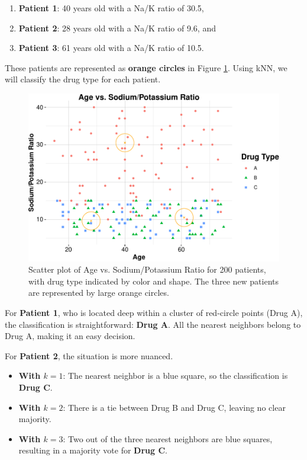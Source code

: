 \documentclass[
]{book}
\providecommand{\tightlist}{%
  \setlength{\itemsep}{0pt}\setlength{\parskip}{0pt}}
\theoremstyle{definition}
\theoremstyle{definition}
\theoremstyle{definition}
\theoremstyle{definition}
\theoremstyle{remark}
\begin{document}
\begin{enumerate}
\def\labelenumi{\arabic{enumi}.}
\tightlist
\item
  \textbf{Patient 1}: 40 years old with a Na/K ratio of 30.5,\\
\item
  \textbf{Patient 2}: 28 years old with a Na/K ratio of 9.6, and\\
\item
  \textbf{Patient 3}: 61 years old with a Na/K ratio of 10.5.
\end{enumerate}

These patients are represented as \textbf{orange circles} in Figure \ref{fig:scatter-plot-ex-drug-2}. Using kNN, we will classify the drug type for each patient.

\begin{figure}

{\centering \includegraphics[width=0.85\linewidth]{knn_files/figure-latex/scatter-plot-ex-drug-2-1} 

}

\caption{Scatter plot of Age vs. Sodium/Potassium Ratio for 200 patients, with drug type indicated by color and shape. The three new patients are represented by large orange circles.}\label{fig:scatter-plot-ex-drug-2}
\end{figure}

For \textbf{Patient 1}, who is located deep within a cluster of red-circle points (Drug A), the classification is straightforward: \textbf{Drug A}. All the nearest neighbors belong to Drug A, making it an easy decision.

For \textbf{Patient 2}, the situation is more nuanced.

\begin{itemize}
\tightlist
\item
  \textbf{With \(k = 1\)}: The nearest neighbor is a blue square, so the classification is \textbf{Drug C}.\\
\item
  \textbf{With \(k = 2\)}: There is a tie between Drug B and Drug C, leaving no clear majority.\\
\item
  \textbf{With \(k = 3\)}: Two out of the three nearest neighbors are blue squares, resulting in a majority vote for \textbf{Drug C}.
\end{itemize}
\end{document}
